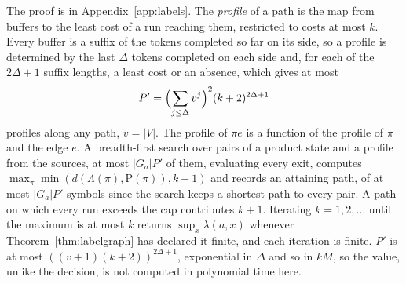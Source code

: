 \documentclass[11pt,a4paper]{article}
\theoremstyle{definition}
\theoremstyle{plain}
\begin{document}
The proof is in Appendix~\ref{app:labels}. The \emph{profile} of a path is the map from buffers to the least cost of a
run reaching them, restricted to costs at most \(k\). Every buffer is a suffix of the tokens completed so far on its
side, so a profile is determined by the last \(\Delta\) tokens completed on each side and, for each of the
\(2\Delta + 1\) suffix lengths, a least cost or an absence, which gives at most
\[
P' = \Bigl(\sum_{j \le \Delta} v^j\Bigr)^2 (k + 2)^{2\Delta + 1}
\]
profiles along any path, \(v = |V|\). The profile of \(\pi e\) is a function of the profile of \(\pi\) and the edge
\(e\). A breadth-first search over pairs of a product state and a profile from the sources, at most \(|G_a| P'\) of
them, evaluating every exit, computes \(\max_\pi \min(d(\Lambda(\pi), \mathrm{P}(\pi)), k + 1)\) and records an
attaining path, of at most \(|G_a| P'\) symbols since the search keeps a shortest path to every pair. A path on which
every run exceeds the cap contributes \(k + 1\). Iterating \(k = 1, 2, \dots\) until the maximum is at most \(k\)
returns \(\sup_x \lambda(a, x)\) whenever Theorem~\ref{thm:labelgraph} has declared it finite, and each iteration is
finite. \(P'\) is at most \(((v + 1)(k + 2))^{2\Delta + 1}\), exponential in \(\Delta\) and so in \(kM\), so the value,
unlike the decision, is not computed in polynomial time here.
\end{document}
